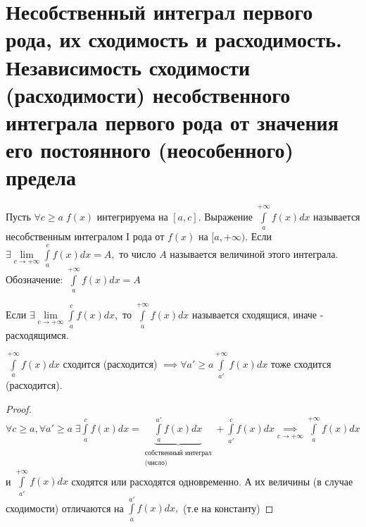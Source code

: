 \documentclass[../main.tex]{subfiles}
\begin{document}

\section{Несобственный интеграл первого рода, их сходимость и расходимость. Независимость сходимости (расходимости) несобственного интеграла первого рода от значения его постоянного (неособенного) предела}


\begin{definition}
    Пусть $\forall c\geqslant a\; f(x)$ интегрируема на $[a,c]$. Выражение $\int\limits_{a   }^{+\infty}f(x)dx  $ называется несобственным интегралом I рода от $f(x) \text{ на } [a,+\infty).$ Если $\exists \lim\limits_{c \to +\infty}\int\limits_{a}^{c} f(x)dx=A,$ то число $A$ называется величиной этого интеграла. Обозначение: $\int\limits_{a    }^{+\infty}f(x)dx=A$   
\end{definition}
\begin{definition}
    Если $\exists \lim\limits_{c    \to +\infty}\int\limits_{a  }^{c    } f(x)dx, $ то $\int\limits_{a  }^{+\infty}f(x)dx  $ называется сходящися, иначе - расходящимся.
\end{definition}

\begin{theorem}
    $\int\limits_{a }^{+\infty} f(x)dx  $ сходится (расходится) $\implies \forall a' \geqslant a \int\limits_{a'}^{+\infty}f(x)dx $ тоже сходится (расходится).
\end{theorem}
\begin{proof}
    $\forall c\geqslant a, \forall a'\geqslant a \; \exists \int\limits_{a  }^{c    } f(x)dx=\underbrace{\int\limits_{a }^{a'}  f(x)dx}_{\substack{\text{собственный интеграл}\\\text{(число)}}}+ \int\limits_{a'}^{c}f(x)dx\underset{c\to+\infty}{\implies} \int\limits_{a   }^{+\infty}f(x)dx $ и $\int\limits_{a'}^{+\infty}f(x)dx $ сходятся или расходятся одновременно. А их величины (в случае сходимости) отличаются на $\int\limits_{a   }^{a'}f(x)dx,$ (т.е на  константу)
    
\end{proof}
\end{document}
